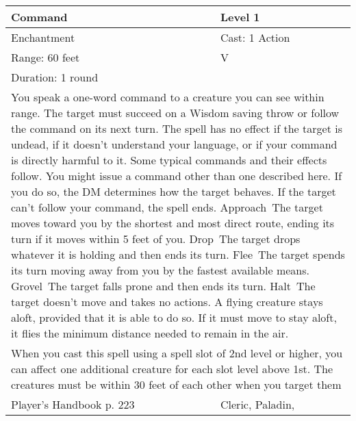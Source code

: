 \documentclass[11pt]{report}
\begin{document}
\begin{table}[H]
	\begin{tabular}{||p{6cm}|p{6cm}||}
		\hline\hline
		\bf{Command} & Level 1\\ \hline
		Enchantment & Cast: 1 Action\\ \hline
		Range: 60 feet & V\\ \hline
		Duration: 1 round & \\ \hline
		\multicolumn{2}{||p{12cm}||}{You speak a one-word command to a creature you can see within range. 
The target must succeed on a Wisdom saving throw or follow the command on its next turn. The spell has no effect if the target is undead, if it doesn’t understand your language, or if your command is directly harmful to it.  Some typical commands and their effects follow. You might issue a command other than one described here. If you do so, the DM determines how the target behaves. If the target can’t follow your command, the spell ends.
Approach The target moves toward you by the shortest and most direct route, ending its turn if it moves within 5 feet of you.
Drop The target drops whatever it is holding and then ends its turn.
Flee The target spends its turn moving away from you by the fastest available means.
Grovel The target falls prone and then ends its turn.
Halt The target doesn’t move and takes no actions. A flying creature stays aloft, provided that it is able to do so. If it must move to stay aloft, it flies the minimum distance needed to remain in the air.}\\ \hline
		\multicolumn{2}{||p{12cm}||}{When you cast this spell using a spell slot of 2nd level or higher, you can affect one additional creature for each slot level above 1st. The creatures must be within 30 feet of each other when you target them}\\ \hline
Player's Handbook p. 223 & Cleric, Paladin, \\ \hline\hline
	\end{tabular}
\end{table}
\end{document}
